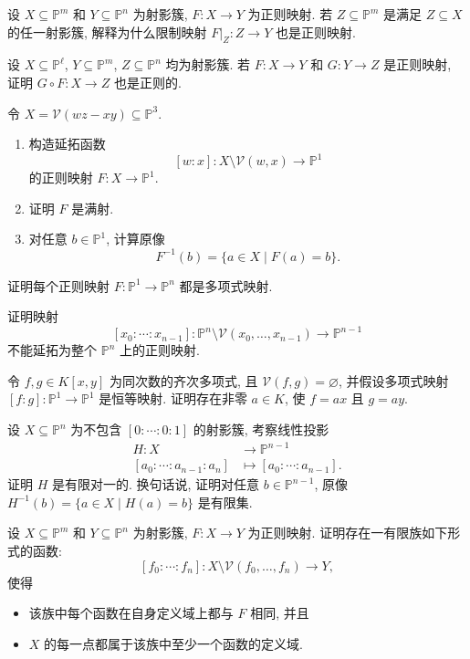 \BookExerciseHeading
\begin{BookExercises}
  \item\label{ex:restrict-regular-map-to-projective-subvariety} 设 $X\subseteq\mathbb{P}^{m}$ 和 $Y\subseteq\mathbb{P}^{n}$ 为射影簇, $F:X\to Y$ 为正则映射. 若 $Z\subseteq\mathbb{P}^{m}$ 是满足 $Z\subseteq X$ 的任一射影簇, 解释为什么限制映射 $F|_{Z}:Z\to Y$ 也是正则映射.
  \item\label{ex:composition-of-projective-regular-maps} 设 $X\subseteq\mathbb{P}^{\ell}$, $Y\subseteq\mathbb{P}^{m}$, $Z\subseteq\mathbb{P}^{n}$ 均为射影簇. 若 $F:X\to Y$ 和 $G:Y\to Z$ 是正则映射, 证明 $G\circ F:X\to Z$ 也是正则的.
  \item\label{ex:regular-projection-from-projective-quadric} 令 $X=\mathcal{V}(wz-xy)\subseteq\mathbb{P}^{3}$.
  \begin{enumerate}
    \item 构造延拓函数
    \[
      [w:x]:X\setminus\mathcal{V}(w,x)\to\mathbb{P}^{1}
    \]
    的正则映射 $F:X\to\mathbb{P}^{1}$.
    \item 证明 $F$ 是满射.
    \item 对任意 $b\in\mathbb{P}^{1}$, 计算原像
    \[
      F^{-1}(b)=\{a\in X\mid F(a)=b\}.
    \]
  \end{enumerate}
  \item\label{ex:regular-map-from-projective-line-is-polynomial} 证明每个正则映射 $F:\mathbb{P}^{1}\to\mathbb{P}^{n}$ 都是多项式映射.
  \item\label{ex:coordinate-projection-does-not-extend-to-center} 证明映射
  \[
    [x_{0}:\cdots:x_{n-1}]:\mathbb{P}^{n}\setminus\mathcal{V}(x_{0},\ldots,x_{n-1})\to\mathbb{P}^{n-1}
  \]
  不能延拓为整个 $\mathbb{P}^{n}$ 上的正则映射.
  \item\label{ex:polynomial-representatives-of-projective-identity} 令 $f,g\in K[x,y]$ 为同次数的齐次多项式, 且 $\mathcal{V}(f,g)=\varnothing$, 并假设多项式映射 $[f:g]:\mathbb{P}^{1}\to\mathbb{P}^{1}$ 是恒等映射. 证明存在非零 $a\in K$, 使 $f=ax$ 且 $g=ay$.
  \item\label{ex:projective-linear-projection-is-finite-to-one} 设 $X\subseteq\mathbb{P}^{n}$ 为不包含 $[0:\cdots:0:1]$ 的射影簇, 考察线性投影
  \[
    \begin{aligned}
      H:X&\to\mathbb{P}^{n-1}\\
      [a_{0}:\cdots:a_{n-1}:a_{n}]&\mapsto[a_{0}:\cdots:a_{n-1}].
    \end{aligned}
  \]
  证明 $H$ 是有限对一的. 换句话说, 证明对任意 $b\in\mathbb{P}^{n-1}$, 原像 $H^{-1}(b)=\{a\in X\mid H(a)=b\}$ 是有限集.
  \item\label{ex:finite-polynomial-representations-cover-regular-map} 设 $X\subseteq\mathbb{P}^{m}$ 和 $Y\subseteq\mathbb{P}^{n}$ 为射影簇, $F:X\to Y$ 为正则映射. 证明存在一有限族如下形式的函数:
  \[
    [f_{0}:\cdots:f_{n}]:X\setminus\mathcal{V}(f_{0},\ldots,f_{n})\to Y,
  \]
  使得
  \begin{itemize}
    \item 该族中每个函数在自身定义域上都与 $F$ 相同, 并且
    \item $X$ 的每一点都属于该族中至少一个函数的定义域.
  \end{itemize}
\end{BookExercises}

